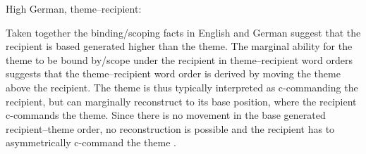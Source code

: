 \begin{exe}
	\ex High German, theme--recipient:\label{ex:hg-binding-tr}
\begin{xlist}
\end{xlist}
\end{exe}

Taken together the binding/scoping facts in English and German suggest that the recipient is based generated higher than the theme. The marginal ability for the theme to be bound by/scope under the recipient in theme--recipient word orders suggests that the theme--recipient word order is derived by moving the theme above the recipient. The theme is thus typically interpreted as c-commanding the recipient, but can marginally reconstruct to its base position, where the recipient c-commands the theme. Since there is no movement in the base generated recipient--theme order, no reconstruction is possible and the recipient has to asymmetrically c-command the theme \citep{Takano.1998}.

